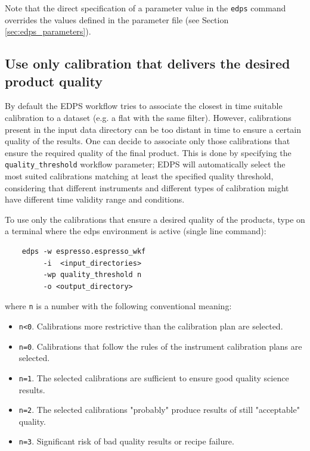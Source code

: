 Note that the direct specification of a parameter value in the {\tt edps} command overrides the values defined in the parameter file (see Section \ref{sec:edps_parameters}). 

\subsection{Use only calibration that delivers the desired product quality}
\label{sec:edps_quality}

By default the EDPS workflow tries to associate the closest in time suitable calibration to a dataset (e.g. a flat with the same filter). However, calibrations present in the input data directory can be too distant in time to ensure a certain quality of the results.
One can decide to associate only those calibrations that ensure the required quality of the final product. This is done by specifying the {\tt quality\_threshold} workflow parameter; EDPS will automatically select the most suited calibrations matching at least the specified quality threshold, considering that different instruments and different types of calibration might have different time validity range and conditions. 

To use only the calibrations that ensure a desired quality of the products, type on a terminal where the edps environment is active (single line command):

\begin{verbatim}
    edps -w espresso.espresso_wkf
         -i  <input_directories> 
         -wp quality_threshold n 
         -o <output_directory>
\end{verbatim}


where {\tt n} is a number with the following conventional meaning:
\begin{itemize}
    \item {\tt n<0}. Calibrations more restrictive than the calibration plan are selected.
    \item {\tt n=0}. Calibrations that follow the rules of the instrument calibration plans are selected.
    \item {\tt n=1}. The selected calibrations are sufficient to ensure good quality science results.
    \item {\tt n=2}. The selected calibrations "probably" produce results of still "acceptable" quality.
    \item {\tt n=3}. Significant risk of bad quality results or recipe failure.
\end{itemize}

